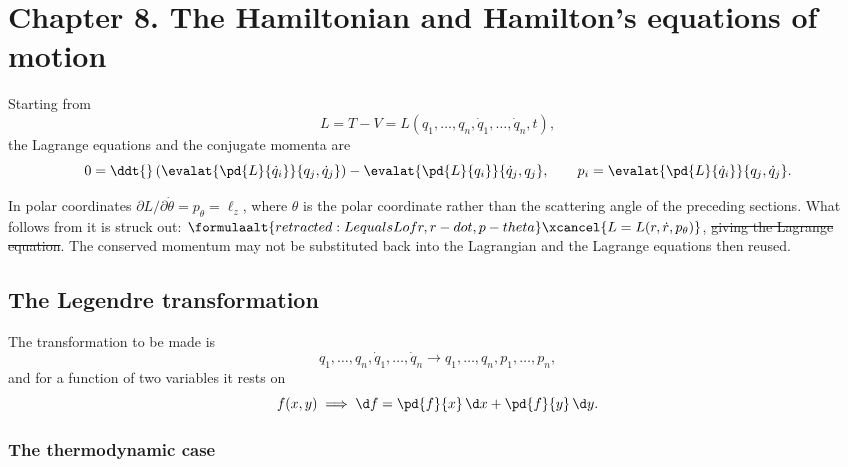 \documentclass[11pt]{article}
\begin{document}
\section{Chapter 8. The Hamiltonian and Hamilton's equations of motion}

Starting from
%
\begin{equation}\label{eq:lagrangian}
  L = T - V = L(q_1,\dots,q_n,\dot q_1,\dots,\dot q_n,t),
\end{equation}
%
the Lagrange equations and the conjugate momenta are
%
\begin{equation}\label{eq:lagrange-eq}
  0 = \ddt{}\left(\evalat{\pd{L}{\dot q_i}}{q_j,\dot q_j}\right)
      - \evalat{\pd{L}{q_i}}{\dot q_j,q_j},
  \qquad
  p_i = \evalat{\pd{L}{\dot q_i}}{q_j,\dot q_j} .
\end{equation}

\begin{remark}
In polar coordinates $\partial L/\partial\dot\theta = p_\theta = \ell_z$,
where $\theta$ is the polar coordinate rather than the scattering angle of the
preceding sections. What follows from it is struck out:
$\formulaalt{retracted: L equals L of r, r-dot, p-theta}%
\xcancel{L = L(r,\dot r,p_\theta)}$,
\sout{giving the Lagrange equation}. The conserved momentum may not be
substituted back into the Lagrangian and the Lagrange equations then reused.
\end{remark}

\subsection{The Legendre transformation}

The transformation to be made is
%
\begin{equation}\label{eq:legendre-goal}
  q_1,\dots,q_n,\dot q_1,\dots,\dot q_n \longrightarrow q_1,\dots,q_n,p_1,\dots,p_n ,
\end{equation}
%
and for a function of two variables it rests on
%
\begin{equation}\label{eq:df}
  f(x,y) \implies \d f = \pd{f}{x}\,\d x + \pd{f}{y}\,\d y .
\end{equation}

\subsubsection{The thermodynamic case}
\end{document}
